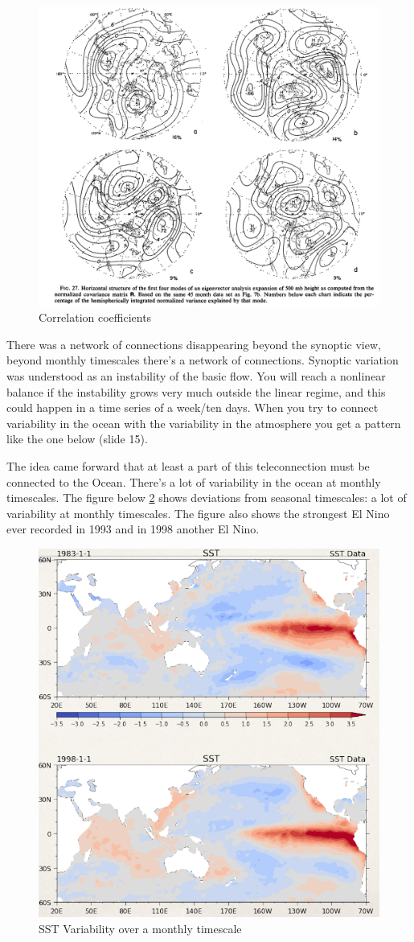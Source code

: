 \begin{figure}[htp!]
	\centering
	\includegraphics[width=0.4\linewidth]{uploads/Screenshot 2024-11-15 155150.png}
	\caption{Correlation coefficients}
	\label{fig:correlation coeff}
\end{figure}
There was a network of connections disappearing beyond the synoptic view, beyond monthly timescales there's a network of connections. Synoptic variation was understood as an instability of the basic flow. You will reach a nonlinear balance if the instability grows very much outside the linear regime, and this could happen in a time series of a week/ten days.
When you try to connect variability in the ocean with the variability in the atmosphere you get a pattern like the one below (slide 15).

The idea came forward that at least a part of this teleconnection must be connected to the Ocean. There's a lot of variability in the ocean at monthly timescales. The figure below \ref{fig:SST VAR} shows deviations from seasonal timescales: a lot of variability at monthly timescales. The figure also shows the strongest El Nino ever recorded in 1993 and in 1998 another El Nino.
\begin{figure}[htp!]
	\centering
	\includegraphics[width=0.4\linewidth]{uploads/Screenshot 2024-11-18 164612.png}
	\caption{SST Variability over a monthly timescale}
	\label{fig:SST VAR}
\end{figure}

